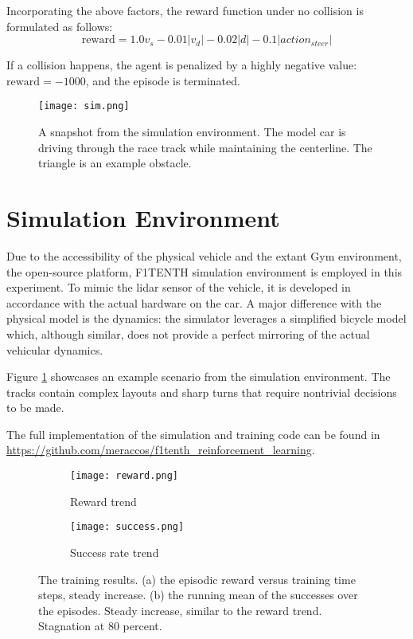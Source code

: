 \documentclass[a4paper, 10pt]{LTJournalArticle}
\begin{document}
Incorporating the above factors, the reward function under no collision is formulated as follows:
\begin{equation*}
    \text{reward} = 1.0v_s - 0.01\lvert v_d \rvert - 0.02\lvert d \rvert - 0.1\lvert action_{steer} \rvert
\end{equation*}

If a collision happens, the agent is penalized by a highly negative value: $\text{reward}=-1000$, and the episode is terminated.

\begin{figure}[!b] %
	\texttt{[image: sim.png]}
	\caption{A snapshot from the simulation environment. The model car is driving through the race track while maintaining the centerline. The triangle is an example obstacle.}
	\label{fig:simulation}
\end{figure}

\section{Simulation Environment}

Due to the accessibility of the physical vehicle and the extant Gym environment, the open-source platform, F1TENTH simulation environment is employed in this experiment. To mimic the lidar sensor of the vehicle, it is developed in accordance with the actual hardware on the car. A major difference with the physical model is the dynamics: the simulator leverages a simplified bicycle model which, although similar, does not provide a perfect mirroring of the actual vehicular dynamics.

Figure \ref{fig:simulation} showcases an example scenario from the simulation environment. The tracks contain complex layouts and sharp turns that require nontrivial decisions to be made.

The full implementation of the simulation and training code can be found in \url{https://github.com/meraccos/f1tenth_reinforcement_learning}.

\begin{figure*}[!t]
  \centering
  \begin{subfigure}[b]{0.49\textwidth}
    \texttt{[image: reward.png]}
    \caption{Reward trend}
  \end{subfigure}
  \hfill
  \begin{subfigure}[b]{0.49\textwidth}
    \texttt{[image: success.png]}
    \caption{Success rate trend}
  \end{subfigure}
  \hfill
  \caption{The training results. (a) the episodic reward versus training time steps, steady increase. (b) the running mean of the successes over the episodes. Steady increase, similar to the reward trend. Stagnation at 80 percent.}
  \label{fig:training}
\end{figure*}
\end{document}

